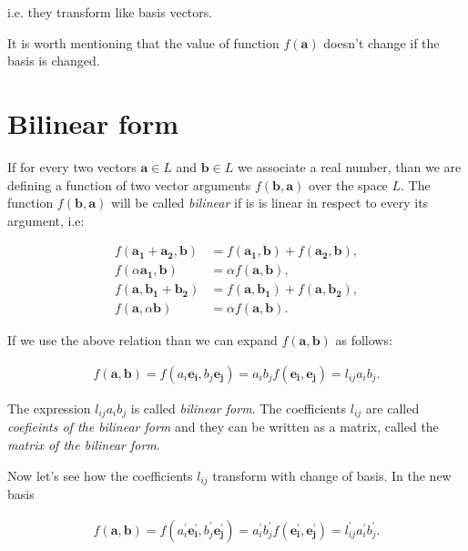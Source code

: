 \documentclass{book}
\begin{document}
i.e. they transform like basis vectors.

It is worth mentioning that the value of function $f(\boldsymbol{a})$ doesn't change if the basis is changed.

\section{Bilinear form}

If for every two vectors $\boldsymbol{a} \in L$ and $\boldsymbol{b} \in L$ we associate a real number, than we are defining a function of two vector arguments $f(\boldsymbol{b}, \boldsymbol{a})$ over the space $L$. The function $f(\boldsymbol{b}, \boldsymbol{a})$ will be called \emph{bilinear} if is is linear in respect to every its argument, i.e:

\begin{align*}
f(\boldsymbol{a_1} + \boldsymbol{a_2}, \boldsymbol{b}) &= f(\boldsymbol{a_1}, \boldsymbol{b}) + f(\boldsymbol{a_2}, \boldsymbol{b}), \\
f(\alpha\boldsymbol{a_1}, \boldsymbol{b}) &= \alpha f(\boldsymbol{a}, \boldsymbol{b}), \\
f(\boldsymbol{a}, \boldsymbol{b_1} + \boldsymbol{b_2}) &= f(\boldsymbol{a}, \boldsymbol{b_1}) + f(\boldsymbol{a}, \boldsymbol{b_2}), \\
f(\boldsymbol{a}, \alpha\boldsymbol{b}) &= \alpha f(\boldsymbol{a}, \boldsymbol{b}).
\end{align*}

If we use the above relation than we can expand $f(\boldsymbol{a}, \boldsymbol{b})$ as follows:

\begin{align*}
f(\boldsymbol{a}, \boldsymbol{b}) = f (a_i\boldsymbol{e_i}, b_j\boldsymbol{e_j}) = a_{i}b_{j}f(\boldsymbol{e_i}, \boldsymbol{e_j}) = l_{ij}a_{i}b_{j} .
\end{align*}

The expression $l_{ij}a_{i}b_{j}$ is called \emph{bilinear form}. The coefficients $l_{ij}$ are called \emph{coefieints of the bilinear form} and they can be written as a matrix, called the \emph{matrix of the bilinear form}.

Now let's see how the coefficients $l_{ij}$ transform with change of basis. In the new basis

\begin{align}
f(\boldsymbol{a}, \boldsymbol{b})
= f (a^{'}_i\boldsymbol{e^{'}_i}, b^{'}_j\boldsymbol{e^{'}_j})
= a^{'}_i b^{'}_j f(\boldsymbol{e^{'}_i}, \boldsymbol{e^{'}_j})
= l^{'}_{ij} a^{'}_i b^{'}_j  . \label{bilinear_transform}
\end{align}
\end{document}
